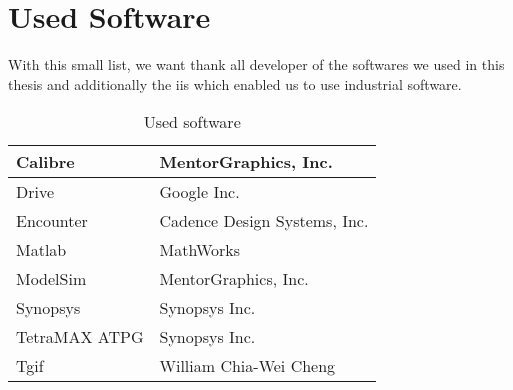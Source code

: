 
\chapter{Used Software}
With this small list, we want thank all developer of the softwares we used in this thesis and additionally the \gls{iis} which enabled us to use industrial software.
 
\begin{table}[h!]
 \caption{Used software}
 \label{tab:softwares}
\centering\begin{tabular}{|l| l|} \hline
Calibre & MentorGraphics, Inc. \\ \hline
Drive & Google Inc. \\ \hline
Encounter & Cadence Design Systems, Inc. \\ \hline
Matlab & MathWorks \\ \hline
ModelSim & MentorGraphics, Inc. \\ \hline
Synopsys & Synopsys Inc. \\ \hline
TetraMAX ATPG & Synopsys Inc. \\ \hline
Tgif & William Chia-Wei Cheng \\ \hline


 \end{tabular}
\end{table}
